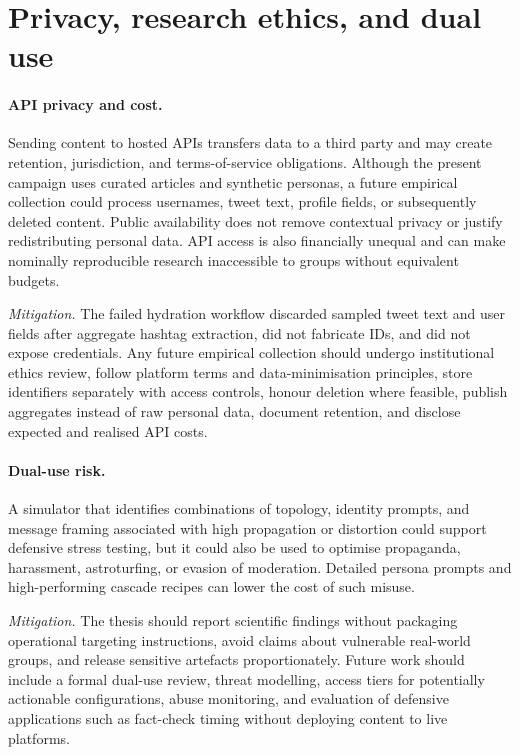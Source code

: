 \section{Privacy, research ethics, and dual use}

\paragraph{API privacy and cost.}
Sending content to hosted APIs transfers data to a third party and may create
retention, jurisdiction, and terms-of-service obligations.  Although the present campaign uses curated articles and synthetic personas, a
future empirical collection could process usernames, tweet text, profile
fields, or subsequently deleted content.  Public
availability does not remove contextual privacy or justify redistributing
personal data.  API access is also financially unequal and can make nominally
reproducible research inaccessible to groups without equivalent budgets.

\emph{Mitigation.}  The failed hydration workflow discarded sampled tweet text
and user fields after aggregate hashtag extraction, did not fabricate IDs,
and did not expose credentials.  Any future empirical collection should
undergo institutional ethics review, follow platform terms and data-minimisation
principles, store identifiers separately with access controls, honour deletion
where feasible, publish aggregates instead of raw personal data, document
retention, and disclose expected and realised API costs.

\paragraph{Dual-use risk.}
A simulator that identifies combinations of topology, identity prompts, and
message framing associated with high propagation or distortion could support
defensive stress testing, but it could also be used to optimise propaganda,
harassment, astroturfing, or evasion of moderation.  Detailed persona prompts
and high-performing cascade recipes can lower the cost of such misuse.

\emph{Mitigation.}  The thesis should report scientific findings without
packaging operational targeting instructions, avoid claims about vulnerable
real-world groups, and release sensitive artefacts proportionately.  Future
work should include a formal dual-use review, threat modelling, access tiers
for potentially actionable configurations, abuse monitoring, and evaluation
of defensive applications such as fact-check timing without deploying
content to live platforms.

